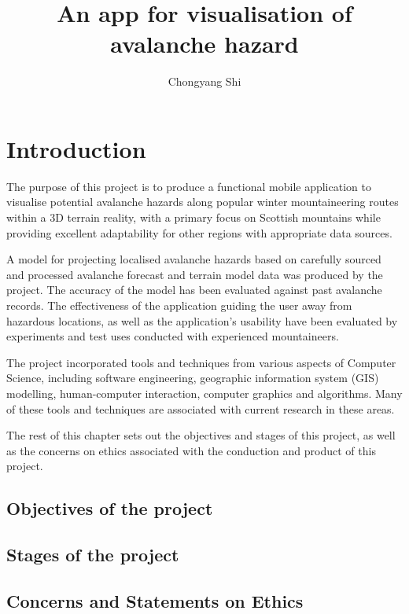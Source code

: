 \documentclass{UoYCSproject}
\title{An app for visualisation of avalanche hazard}
\author{Chongyang Shi}
\date{}
\begin{document}
\maketitle

\chapter{Introduction}

The purpose of this project is to produce a functional mobile application to visualise potential avalanche hazards along popular winter mountaineering routes within a 3D terrain reality, with a primary focus on Scottish mountains while providing excellent adaptability for other regions with appropriate data sources. 

A model for projecting localised avalanche hazards based on carefully sourced and processed avalanche forecast and terrain model data was produced by the project. The accuracy of the model has been evaluated against past avalanche records. The effectiveness of the application guiding the user away from hazardous locations, as well as the application's usability have been evaluated by experiments and test uses conducted with experienced mountaineers.

The project incorporated tools and techniques from various aspects of Computer Science, including software engineering, geographic information system (GIS) modelling, human-computer interaction, computer graphics and algorithms. Many of these tools and techniques are associated with current research in these areas.

The rest of this chapter sets out the objectives and stages of this project, as well as the concerns on ethics associated with the conduction and product of this project.

\section{Objectives of the project}

\section{Stages of the project}

\section{Concerns and Statements on Ethics}

\small{}
\end{document}

